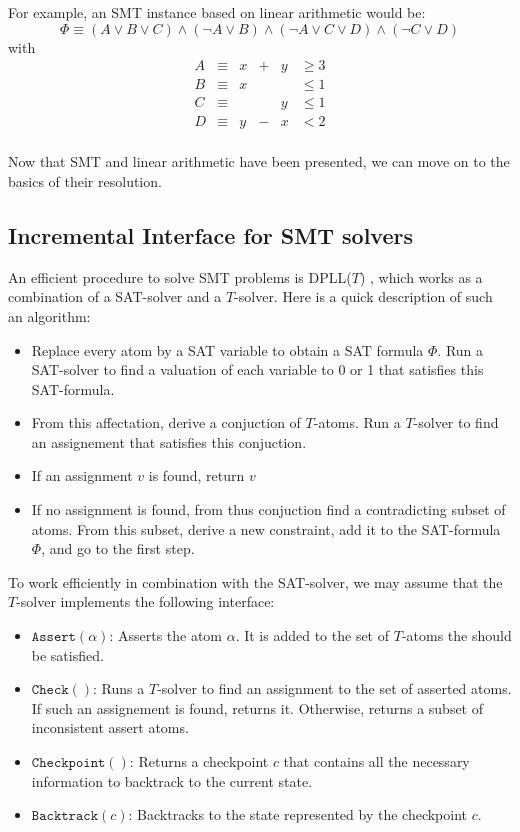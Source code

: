 \documentclass{article}
\newcommand{\iassert}[1]{\mathtt{Assert}(#1)}
\newcommand{\icheck}{\mathtt{Check}()}
\newcommand{\icheckpoint}{\mathtt{Checkpoint}()}
\newcommand{\ibacktrack}[1]{\mathtt{Backtrack}(#1)}
\begin{document}
For example, an SMT instance based on linear arithmetic would be:
$$\Phi \equiv (A \vee B \vee C) \wedge (\neg A \vee B) \wedge
              (\neg A \vee C \vee D) \wedge (\neg C \vee D)$$
with
\begin{displaymath}
\begin{array}{lclccc}
  A & \equiv & x & + & y & \geqslant 3 \\
  B & \equiv & x &   &   & \leqslant 1 \\
  C & \equiv &   &   & y & \leqslant 1 \\
  D & \equiv & y & - & x & < 2         \\
\end{array}
\end{displaymath}

Now that SMT and linear arithmetic have been presented, we can move on to the
basics of their resolution.

\subsection{Incremental Interface for SMT solvers}
An efficient procedure to solve SMT problems is DPLL($T$)
\cite[Section 3.2]{Decision2016},
which works as a combination of a SAT-solver and a $T$-solver. Here is a quick
description of such an algorithm:
\begin{itemize}
  \item Replace every atom by a SAT variable to obtain a SAT formula $\Phi$.
    Run a SAT-solver to find a valuation of each variable to 0 or 1 that
    satisfies this SAT-formula.
  \item From this affectation, derive a conjuction of $T$-atoms. Run a
    $T$-solver to find an assignement that satisfies this conjuction.
  \item If an assignment $v$ is found, return $v$
  \item If no assignment is found, from thus conjuction find a contradicting
    subset of atoms. From this subset, derive a new constraint, add it to the
    SAT-formula $\Phi$, and go to the first step.
\end{itemize}

To work efficiently in combination with the SAT-solver, we may assume that the
$T$-solver implements the following interface:
\begin{itemize}
  \item $\iassert{\alpha}$: Asserts the atom $\alpha$. It is added to the set of
    $T$-atoms the should be satisfied.
  \item $\icheck$: Runs a $T$-solver to find an assignment to the set of
    asserted atoms. If such an assignement is found, returns it. Otherwise,
    returns a subset of inconsistent assert atoms.
  \item $\icheckpoint$: Returns a checkpoint $c$ that contains all the necessary
    information to backtrack to the current state.
  \item $\ibacktrack{c}$: Backtracks to the state represented by the checkpoint
    $c$.
\end{itemize}
\end{document}
